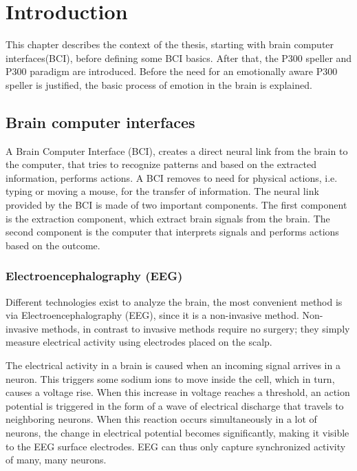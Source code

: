 \chapter{Introduction}
{\samenvatting This chapter describes the context of the thesis, starting with brain computer interfaces(BCI), before defining some BCI basics. After that, the P300 speller and P300 paradigm are introduced. Before the need for an emotionally aware P300 speller is justified, the basic process of emotion in the brain is explained.}


\section{Brain computer interfaces}

A Brain Computer Interface (BCI), creates a direct neural link from the brain to the computer\cite{LangModel}, that tries to recognize patterns and based on the extracted information, performs actions. A BCI removes to need for physical actions, i.e. typing or moving a mouse, for the transfer of information. The neural link provided by the BCI is made of two important components. The first component is the extraction component, which extract brain signals from the brain. The second component is the computer that interprets signals and performs actions based on the outcome.


\subsection{Electroencephalography (EEG)}
Different technologies exist to analyze the brain, the most convenient method is via Electroencephalography (EEG), since it is a non-invasive method. Non-invasive methods, in contrast to invasive methods require no surgery; they simply measure electrical activity using electrodes placed on the scalp.

\npar

The electrical activity in a brain is caused when an incoming signal arrives in a neuron. This triggers some sodium ions to move inside the cell, which in turn, causes a voltage rise\cite{ExtendedPaper}. When this increase in voltage reaches a threshold, an action potential is triggered in the form of a wave of electrical discharge that travels to neighboring neurons. When this reaction occurs simultaneously in a lot of neurons, the change in electrical potential becomes significantly, making it visible to the EEG surface electrodes. EEG can thus only capture synchronized activity of many, many neurons.

